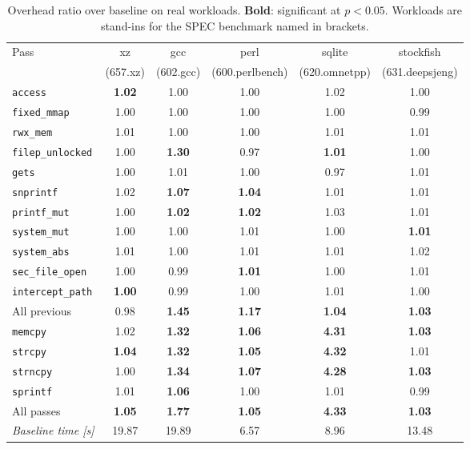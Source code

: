 \documentclass[11pt,a4paper]{article}
\newcommand{\pass}[1]{\texttt{#1}}
\begin{document}
\begin{table}[H]
\centering\small
\caption{Overhead ratio over baseline on real workloads. \textbf{Bold}: significant at $p<0.05$.
Workloads are stand-ins for the SPEC benchmark named in brackets.}
\label{tab:t3}
\begin{tabular}{@{}l ccccc@{}}
\toprule
Pass & xz & gcc & perl & sqlite & stockfish \\
 & \footnotesize(657.xz) & \footnotesize(602.gcc) & \footnotesize(600.perlbench) & \footnotesize(620.omnetpp) & \footnotesize(631.deepsjeng) \\
\midrule
\pass{access}         & \textbf{1.02} & 1.00 & 1.00 & 1.02 & 1.00 \\
\pass{fixed\_mmap}    & 1.00 & 1.00 & 1.00 & 1.00 & 0.99 \\
\pass{rwx\_mem}       & 1.01 & 1.00 & 1.00 & 1.01 & 1.01 \\
\pass{filep\_unlocked}& 1.00 & \textbf{1.30} & 0.97 & \textbf{1.01} & 1.00 \\
\pass{gets}           & 1.00 & 1.01 & 1.00 & 0.97 & 1.01 \\
\pass{snprintf}       & 1.02 & \textbf{1.07} & \textbf{1.04} & 1.01 & 1.01 \\
\pass{printf\_mut}    & 1.00 & \textbf{1.02} & \textbf{1.02} & 1.03 & 1.01 \\
\pass{system\_mut}    & 1.00 & 1.00 & 1.01 & 1.00 & \textbf{1.01} \\
\pass{system\_abs}    & 1.01 & 1.00 & 1.01 & 1.01 & 1.02 \\
\pass{sec\_file\_open}& 1.00 & 0.99 & \textbf{1.01} & 1.00 & 1.01 \\
\pass{intercept\_path}& \textbf{1.00} & 0.99 & 1.00 & 1.01 & 1.00 \\
All previous          & 0.98 & \textbf{1.45} & \textbf{1.17} & \textbf{1.04} & \textbf{1.03} \\
\midrule
\pass{memcpy}         & 1.02 & \textbf{1.32} & \textbf{1.06} & \textbf{4.31} & \textbf{1.03} \\
\pass{strcpy}         & \textbf{1.04} & \textbf{1.32} & \textbf{1.05} & \textbf{4.32} & 1.01 \\
\pass{strncpy}        & 1.00 & \textbf{1.34} & \textbf{1.07} & \textbf{4.28} & \textbf{1.03} \\
\pass{sprintf}        & 1.01 & \textbf{1.06} & 1.00 & 1.01 & 0.99 \\
All passes            & \textbf{1.05} & \textbf{1.77} & \textbf{1.05} & \textbf{4.33} & \textbf{1.03} \\
\midrule
\emph{Baseline time [s]} & 19.87 & 19.89 & 6.57 & 8.96 & 13.48 \\
\bottomrule
\end{tabular}
\end{table}
\end{document}
